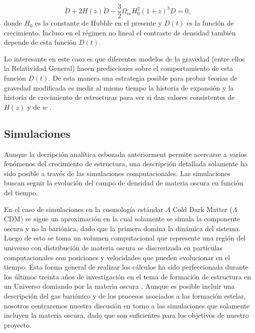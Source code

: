 \documentclass[spanish,notitlepage,letterpaper,11pt]{article} %
\begin{document}
\begin{equation}
\ddot{D} + 2H(z)\dot{D}- \frac{3}{2}\Omega_mH_{0}^2(1+z)^3D=0,
\end{equation}
%
donde $H_0$ es la constante de Hubble en el presente y $D(t)$ es la
funci\'on de crecimiento. Incluso en el r\'egimen no lineal el
contraste de densidad tambi\'en depende de esta funci\'on $D(t)$.  

Lo interesante en este caso es que diferentes modelos de la gravedad
(entre ellos la Relatividad General) hacen predicciones sobre el
comportamiento de esta funci\'on $D(t)$. De esta manera una estrategia
posible para probar teorias de gravedad modificada es medir al mismo
tiempo la historia de expansi\'on y la historia de crecimiento de
estructuras para ver si dan valores consistentes de $H(z)$ y de
$w$ \cite{2014arXiv1401.0046M}. 

\subsection{Simulaciones}

Aunque la decripci\'on anal\'itica esbozada anteriorment
permite acercarse a varios fen\'omenos del crecimiento de estructura,
una descripci\'on detallada solamente ha sido posible a trav\'es de
las simulaciones computacionales. Las simulaciones buscan seguir la
evoluci\'on del campo de densidad de materia oscura en funci\'on del
tiempo. 

En el caso de simulaciones en la cosmolog\'ia est\'andar $\Lambda$
Cold Dark Matter ($\Lambda$CDM) se sigue un aproximaci\'on en la cual
solamente se simula la componente oscura y no la bari\'onica, dado que
la primera domina la din\'amica del sistema. Luego de esto se toma un
volumen computacional que represente una regi\'on del universo con
distribuci\'on de materia oscura se discrerizada en part\'iculas
computacionales con posiciones y velocidades que pueden evolucionar en
el tiempo.  Esta forma general de realizar los c\'alculos ha sido
perfeccionada durante los \'ultimos treinta a\~nos de investigaci\'on
en el tema de formaci\'on de estructura en un Universo domiando por la
materia oscura
\cite{1985ApJ...292..371D,1999ApJ...522...82K,2005Natur.435..629S}.
Aunque es posible incluir una descripci\'on del gas bari\'onico y de
los procesos asociados a las formaci\'on estelar, nosotros centraremos
nuestra discusi\'on en torno a las simulaciones que solamente incluyen
la materia oscura, dado que son suficientes para los objetivos de
nuestro proyecto.
\end{document}

